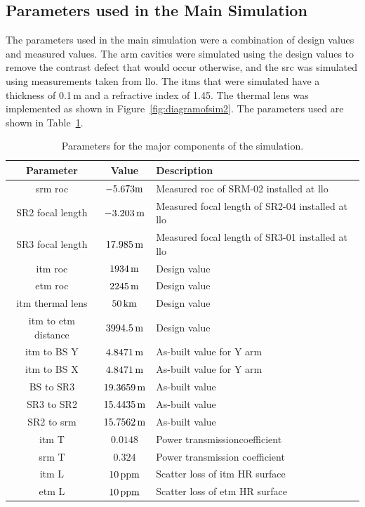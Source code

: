 \subsection{Parameters used in the Main Simulation}
The parameters used in the main simulation were a combination of design values and measured values. The arm cavities were simulated using the design values to remove the contrast defect that would occur otherwise, and the \gls{src} was simulated using measurements taken from \gls{llo}. The \glspl{itm} that were simulated have a thickness of 0.1\,m and a refractive index of 1.45. The thermal lens was implemented as shown in Figure~\ref{fig:diagramofsim2}. The parameters used are shown in Table~\ref{tab:nominal simulation}. 
\begin{table}[ht]
	\centering
	\begin{tabular}[h]{ c | c | p{45mm}  }
		Parameter & Value & Description \\
		\hline
		\gls{srm} \gls{roc} &  $-5.673\rm{m}$ &  Measured \gls{roc} of SRM-02 installed at \gls{llo}   \\
		SR2 focal length &  $-3.203\,\rm{m}$ &  Measured focal length of SR2-04 installed at \gls{llo} \\
		SR3 focal length & $17.985\,\rm{m}$ &  Measured focal length of SR3-01 installed at \gls{llo} \\
		\gls{itm} \gls{roc} &  $1934\,\rm{m}$ &  Design value \\
		\gls{etm} \gls{roc} &  $2245\,\rm{m}$ &  Design value \\
		\gls{itm} thermal lens &  $50\,\rm{km}$ & Design value \\
		\gls{itm} to \gls{etm} distance & $3994.5\,\rm{m}$& Design value \\
		\gls{itm} to BS Y &  $4.8471\,\rm{m}$ & As-built value for Y arm \\
		\gls{itm} to BS X &  $4.8471\,\rm{m}$ & As-built value for Y arm \\
		BS to SR3 & $19.3659\,\rm{m}$ & As-built value \\
		SR3 to SR2 & $15.4435\,\rm{m}$ & As-built value \\
		SR2 to \gls{srm} & $15.7562\,\rm{m}$ & As-built value \\
		\gls{itm} T & $0.0148$ & Power transmission\newline coefficient \\
		\gls{srm} T & $0.324$ & Power transmission \newline coefficient \\
		\gls{itm} L & $10\,\rm{ppm}$ & Scatter loss of \gls{itm} HR surface \\
		\gls{etm} L & $10\,\rm{ppm}$ & Scatter loss of \gls{etm} HR surface
	\end{tabular}
	\caption{Parameters for the major components of the simulation.}
	\label{tab:nominal simulation}
\end{table}
\clearpage
